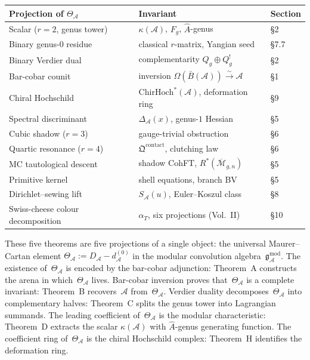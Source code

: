 \documentclass[11pt]{report}
\theoremstyle{definition}
\theoremstyle{remark}
\providecommand{\cA}{\mathcal{A}}
\providecommand{\cM}{\mathcal{M}}
\providecommand{\barB}{\bar{B}}
\providecommand{\gAmod}{\mathfrak{g}^{\mathrm{mod}}_\cA}
\numberwithin{equation}{section}
\begin{document}
\medskip
\begin{center}
\small
\renewcommand{\arraystretch}{1.15}
\begin{tabular}{lll}
\textbf{Projection of $\Theta_\cA$}
 & \textbf{Invariant} & \textbf{Section} \\
\hline
Scalar ($r=2$, genus tower)
 & $\kappa(\cA)$, $F_g$, $\hat A$-genus
 & \S2 \\[2pt]
Binary genus-$0$ residue
 & classical $r$-matrix, Yangian seed
 & \S7.7 \\[2pt]
Binary Verdier dual
 & complementarity $Q_g \oplus Q_g^!$
 & \S2 \\[2pt]
Bar-cobar counit
 & inversion $\Omega(\barB(\cA))\xrightarrow{\sim}\cA$
 & \S1 \\[2pt]
Chiral Hochschild
 & $\mathrm{ChirHoch}^*(\cA)$, deformation ring
 & \S9 \\[2pt]
Spectral discriminant
 & $\Delta_\cA(x)$, genus-$1$ Hessian
 & \S5 \\[2pt]
Cubic shadow ($r=3$)
 & gauge-trivial obstruction
 & \S6 \\[2pt]
Quartic resonance ($r=4$)
 & $\mathfrak Q^{\mathrm{contact}}$, clutching law
 & \S6 \\[2pt]
MC tautological descent
 & shadow CohFT, $R^*(\overline{\cM}_{g,n})$
 & \S5 \\[2pt]
Primitive kernel
 & shell equations, branch BV
 & \S5 \\[2pt]
Dirichlet--sewing lift
 & $S_\cA(u)$, Euler--Koszul class
 & \S8 \\[2pt]
Swiss-cheese colour decomposition
 & $\alpha_T$, six projections (Vol.~II)
 & \S10
\end{tabular}
\end{center}
\medskip

\noindent
These five theorems are five projections of a single object:
the universal Maurer--Cartan element
$\Theta_\cA := D_\cA - d_\cA^{(0)}$
in the modular convolution algebra~$\gAmod$.
The existence of~$\Theta_\cA$ is encoded by the bar-cobar adjunction:
Theorem~A constructs the arena in which~$\Theta_\cA$ lives.
Bar-cobar inversion proves that~$\Theta_\cA$ is a complete invariant:
Theorem~B recovers~$\cA$ from~$\Theta_\cA$.
Verdier duality decomposes~$\Theta_\cA$ into complementary halves:
Theorem~C splits the genus tower into Lagrangian summands.
The leading coefficient of~$\Theta_\cA$ is the modular characteristic:
Theorem~D extracts the scalar $\kappa(\cA)$ with $\hat A$-genus generating function.
The coefficient ring of~$\Theta_\cA$ is the chiral Hochschild complex:
Theorem~H identifies the deformation ring.
\end{document}
